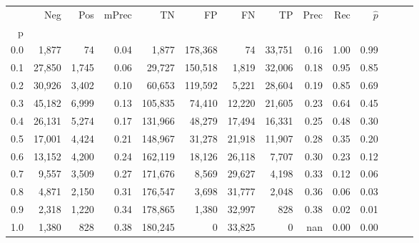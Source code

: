 \begin{tabular}{rrrrrrrrrrrrrr}
\toprule
{} &     Neg &    Pos & mPrec &       TN &       FP &      FN &      TP &  Prec &   Rec & $\hat{p}$ \\
p   &         &        &       &          &          &         &         &       &       &           \\
\midrule
0.0 &   1,877 &     74 &  0.04 &    1,877 &  178,368 &      74 &  33,751 &  0.16 &  1.00 &      0.99 \\
0.1 &  27,850 &  1,745 &  0.06 &   29,727 &  150,518 &   1,819 &  32,006 &  0.18 &  0.95 &      0.85 \\
0.2 &  30,926 &  3,402 &  0.10 &   60,653 &  119,592 &   5,221 &  28,604 &  0.19 &  0.85 &      0.69 \\
0.3 &  45,182 &  6,999 &  0.13 &  105,835 &   74,410 &  12,220 &  21,605 &  0.23 &  0.64 &      0.45 \\
0.4 &  26,131 &  5,274 &  0.17 &  131,966 &   48,279 &  17,494 &  16,331 &  0.25 &  0.48 &      0.30 \\
0.5 &  17,001 &  4,424 &  0.21 &  148,967 &   31,278 &  21,918 &  11,907 &  0.28 &  0.35 &      0.20 \\
0.6 &  13,152 &  4,200 &  0.24 &  162,119 &   18,126 &  26,118 &   7,707 &  0.30 &  0.23 &      0.12 \\
0.7 &   9,557 &  3,509 &  0.27 &  171,676 &    8,569 &  29,627 &   4,198 &  0.33 &  0.12 &      0.06 \\
0.8 &   4,871 &  2,150 &  0.31 &  176,547 &    3,698 &  31,777 &   2,048 &  0.36 &  0.06 &      0.03 \\
0.9 &   2,318 &  1,220 &  0.34 &  178,865 &    1,380 &  32,997 &     828 &  0.38 &  0.02 &      0.01 \\
1.0 &   1,380 &    828 &  0.38 &  180,245 &        0 &  33,825 &       0 &   nan &  0.00 &      0.00 \\
\bottomrule
\end{tabular}
